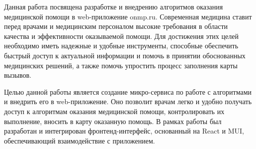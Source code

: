 \abstract %


Данная работа посвящена разработке и внедрению алгоритмов оказания медицинской помощи в web-приложение onmp.ru. Современная медицина ставит перед врачами и медицинским персоналом высокие требования в области качества и эффективности оказываемой помощи. Для достижения этих целей необходимо иметь надежные и удобные инструменты, способные обеспечить быстрый доступ к актуальной информации и помочь в принятии обоснованных медицинских решений, а также помочь упростить процесс заполнения карты вызывов.

Целью данной работы является создание микро-сервиса по работе с алгоритмами и внедрить его в web-приложение. Оно позволит врачам легко и удобно получать доступ к алгоритмам оказания медицинской помощи, контролировать их выполнение, вносить в карту оказанную помощь. В рамках работы был разработан и интегрирован фронтенд-интерфейс, основанный на React и MUI, обеспечивающий взаимодействие с приложением.
